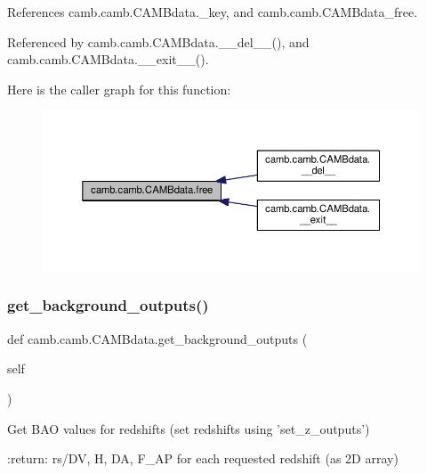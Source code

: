 References camb.\+camb.\+C\+A\+M\+Bdata.\+\_\+key, and camb.\+camb.\+C\+A\+M\+Bdata\+\_\+free.



Referenced by camb.\+camb.\+C\+A\+M\+Bdata.\+\_\+\+\_\+del\+\_\+\+\_\+(), and camb.\+camb.\+C\+A\+M\+Bdata.\+\_\+\+\_\+exit\+\_\+\+\_\+().

Here is the caller graph for this function\+:
\nopagebreak
\begin{figure}[H]
\begin{center}
\leavevmode
\includegraphics[width=350pt]{classcamb_1_1camb_1_1CAMBdata_ab591e03bed9e6aae5d00f6258db48e33_icgraph}
\end{center}
\end{figure}
\mbox{\label{classcamb_1_1camb_1_1CAMBdata_a16b60e35b6ec458d66db2895ada43acb}} 
\subsubsection{\texorpdfstring{get\+\_\+background\+\_\+outputs()}{get\_background\_outputs()}}
{\footnotesize\ttfamily def camb.\+camb.\+C\+A\+M\+Bdata.\+get\+\_\+background\+\_\+outputs (\begin{DoxyParamCaption}\item[{}]{self }\end{DoxyParamCaption})}

\begin{DoxyVerb}Get BAO values for redshifts (set redshifts using 'set_z_outputs')

:return: rs/DV, H, DA, F_AP for each requested redshift (as 2D array)
\end{DoxyVerb}
 

